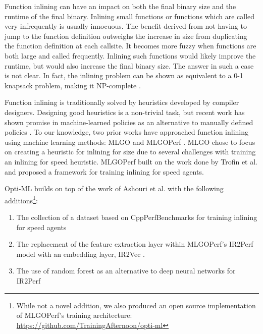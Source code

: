\documentclass[nohyperref]{article}
\theoremstyle{plain}
\theoremstyle{definition}
\theoremstyle{remark}
\begin{document}
Function inlining can have an impact on both the final binary size and the runtime of the final binary. Inlining small functions or functions which are called very infrequently is usually innocuous. The benefit derived from not having to jump to the function definition outweighs the increase in size from duplicating the function definition at each callsite. It becomes more fuzzy when functions are both large and called frequently. Inlining such functions would likely improve the runtime, but would also increase the final binary size. The answer in such a case is not clear. In fact, the inlining problem can be shown as equivalent to a 0-1 knapsack problem, making it NP-complete \cite{Theodoridis_Grosser_Su_2022}. 

Function inlining is traditionally solved by heuristics developed by compiler designers. Designing good heuristics is a non-trivial task, but recent work has shown promise in machine-learned policies as an alternative to manually defined policies \cite{mlgo}. To our knowledge, two prior works have approached function inlining using machine learning methods: MLGO \cite{mlgo} and MLGOPerf \cite{mlgoperf}. MLGO chose to focus on creating a heuristic for inlining for size due to several challenges with training an inlining for speed heuristic. MLGOPerf built on the work done by Trofin et al. and proposed a framework for training inlining for speed agents.

Opti-ML builds on top of the work of Ashouri et al. with the following additions\footnote{While not a novel addition, we also produced an open source implementation of MLGOPerf's training architecture: \href{https://github.com/TrainingAfternoon/opti-ml}{https://github.com/TrainingAfternoon/opti-ml}}:
\begin{enumerate}
    \item The collection of a dataset based on CppPerfBenchmarks \cite{cpp-perf-benchmarks} for training inlining for speed agents
    \item The replacement of the feature extraction layer within MLGOPerf's IR2Perf model with an embedding layer, IR2Vec \cite{ir2vec}. %
    \item The use of random forest as an alternative to deep neural networks for IR2Perf
\end{enumerate}
\end{document}
